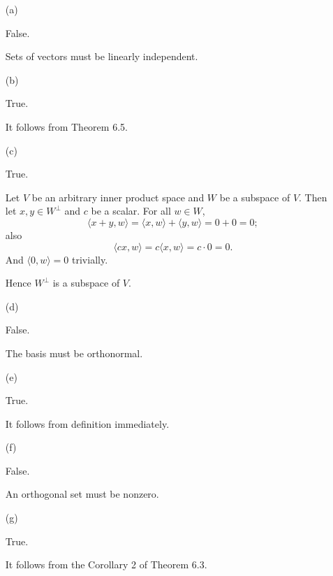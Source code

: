 \begin{Exercise}
\begin{enumerate}[(a)]
\item[(a)]
\begin{answer}
False.
\end{answer}
\begin{solution}
Sets of vectors must be linearly independent.
\end{solution}

\item[(b)]
\begin{answer}
True.
\end{answer}
\begin{solution}
It follows from Theorem 6.5.
\end{solution}

\item[(c)]
\begin{answer}
True.
\end{answer}
\begin{solution}
Let $V$ be an arbitrary inner product space and $W$ be a subspace of $V$. Then let $x,y\in W^{\perp}$ and $c$ be a scalar. For all $w\in W$,
$$
\langle x+y, w \rangle = \langle x,w \rangle + \langle y,w \rangle = 0 + 0 = 0;
$$
also
$$
\langle c x, w \rangle = c \langle x,w \rangle = c\cdot 0 = 0.
$$
And $\langle 0, w \rangle = 0$ trivially.

Hence $W^{\perp}$ is a subspace of $V$.
\end{solution}

\item[(d)]
\begin{answer}
False.
\end{answer}
\begin{solution}
The basis must be orthonormal.
\end{solution}

\item[(e)]
\begin{answer}
True.
\end{answer}
\begin{solution}
It follows from definition immediately.
\end{solution}

\item[(f)]
\begin{answer}
False.
\end{answer}
\begin{solution}
An orthogonal set must be nonzero.
\end{solution}

\item[(g)]
\begin{answer}
True.
\end{answer}
\begin{solution}
It follows from the Corollary 2 of Theorem 6.3.
\end{solution}

\end{enumerate}
\end{Exercise}
